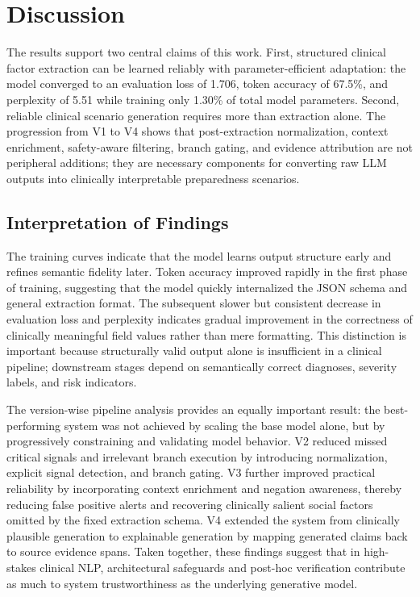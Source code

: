 \documentclass[conference]{IEEEtran}
\begin{document}
\section{Discussion}

The results support two central claims of this work. First, structured clinical factor extraction can be learned reliably with parameter-efficient adaptation: the model converged to an evaluation loss of 1.706, token accuracy of 67.5\%, and perplexity of 5.51 while training only 1.30\% of total model parameters. Second, reliable clinical scenario generation requires more than extraction alone. The progression from V1 to V4 shows that post-extraction normalization, context enrichment, safety-aware filtering, branch gating, and evidence attribution are not peripheral additions; they are necessary components for converting raw LLM outputs into clinically interpretable preparedness scenarios.

\subsection{Interpretation of Findings}

The training curves indicate that the model learns output structure early and refines semantic fidelity later. Token accuracy improved rapidly in the first phase of training, suggesting that the model quickly internalized the JSON schema and general extraction format. The subsequent slower but consistent decrease in evaluation loss and perplexity indicates gradual improvement in the correctness of clinically meaningful field values rather than mere formatting. This distinction is important because structurally valid output alone is insufficient in a clinical pipeline; downstream stages depend on semantically correct diagnoses, severity labels, and risk indicators.

The version-wise pipeline analysis provides an equally important result: the best-performing system was not achieved by scaling the base model alone, but by progressively constraining and validating model behavior. V2 reduced missed critical signals and irrelevant branch execution by introducing normalization, explicit signal detection, and branch gating. V3 further improved practical reliability by incorporating context enrichment and negation awareness, thereby reducing false positive alerts and recovering clinically salient social factors omitted by the fixed extraction schema. V4 extended the system from clinically plausible generation to explainable generation by mapping generated claims back to source evidence spans. Taken together, these findings suggest that in high-stakes clinical NLP, architectural safeguards and post-hoc verification contribute as much to system trustworthiness as the underlying generative model.
\end{document}
